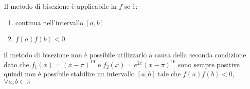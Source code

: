Il metodo di bisezione è applicabile in $f$ se è:
\begin{enumerate}
\item continua nell'intervallo $[a,b]$
\item $f(a)f(b)<0$
\end{enumerate}

\begin{flushleft}
il metodo di bisezione non è possibile utilizzarlo a causa della seconda condizione dato che $f_1(x)=(x-\pi)^{10}$ e $f_2(x)=e^{2x}(x-\pi)^{10}$ sono sempre positive quindi non è possibile stabilire un intervallo $[a,b]$ tale che $f(a)f(b)<0$, $\forall a,b \in \mathbb{R}$
\end{flushleft}
 

